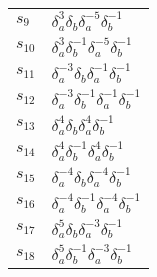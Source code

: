 \documentclass{article}
\begin{document}
\begin{center}
\begin{tabular}{ll}
$s_{9}$ & $\delta_a^{3}\delta_b^{}\delta_a^{-5}\delta_b^{-1}$ \\
$s_{10}$ & $\delta_a^{3}\delta_b^{-1}\delta_a^{-5}\delta_b^{-1}$ \\
$s_{11}$ & $\delta_a^{-3}\delta_b^{}\delta_a^{-1}\delta_b^{-1}$ \\
$s_{12}$ & $\delta_a^{-3}\delta_b^{-1}\delta_a^{-1}\delta_b^{-1}$ \\
$s_{13}$ & $\delta_a^{4}\delta_b^{}\delta_a^{4}\delta_b^{-1}$ \\
$s_{14}$ & $\delta_a^{4}\delta_b^{-1}\delta_a^{4}\delta_b^{-1}$ \\
$s_{15}$ & $\delta_a^{-4}\delta_b^{}\delta_a^{-4}\delta_b^{-1}$ \\
$s_{16}$ & $\delta_a^{-4}\delta_b^{-1}\delta_a^{-4}\delta_b^{-1}$ \\
$s_{17}$ & $\delta_a^{5}\delta_b^{}\delta_a^{-3}\delta_b^{-1}$ \\
$s_{18}$ & $\delta_a^{5}\delta_b^{-1}\delta_a^{-3}\delta_b^{-1}$ \\
\bottomrule
\end{tabular}
\end{center}

\thispagestyle{empty}
\end{document}
